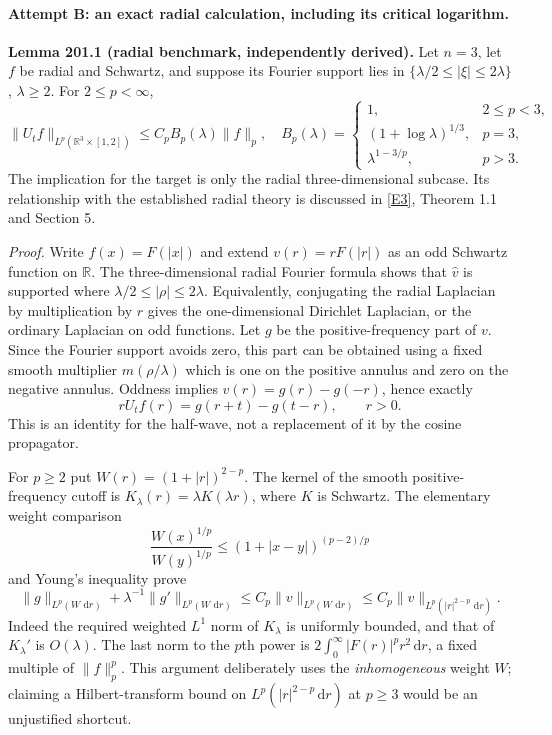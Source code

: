 \documentclass[11pt]{article}
\newcommand{\R}{\mathbb{R}}
\newcommand{\dd}{\,\mathrm d}
\newcommand{\eref}[2]{\hyperlink{extra:#1:#2}{[E#2]}}
\begin{document}
	\paragraph{Attempt B: an exact radial calculation, including its critical logarithm.}
	\textbf{Lemma 201.1 (radial benchmark, independently derived).}
	Let $n=3$, let $f$ be radial and Schwartz, and suppose its Fourier support
	lies in $\{\lambda/2\leq|\xi|\leq2\lambda\}$, $\lambda\geq2$.
	For $2\leq p<\infty$,
	\begin{equation}\label{statement:radialbound}
		\|U_tf\|_{L^p(\R^3\times[1,2])}
		\leq C_p B_p(\lambda)\|f\|_p,
		\quad
		B_p(\lambda)=
		\begin{cases}
			1,&2\leq p<3,\\
			(1+\log\lambda)^{1/3},&p=3,\\
			\lambda^{1-3/p},&p>3.
		\end{cases}
	\end{equation}
	The implication for the target is only the radial three-dimensional
	subcase. Its relationship with the established radial theory is discussed
	in \eref{statement}{3}, Theorem 1.1 and Section 5.
	
	\emph{Proof.}
	Write $f(x)=F(|x|)$ and extend $v(r)=rF(|r|)$ as an odd Schwartz
	function on $\R$. The three-dimensional radial Fourier formula shows
	that $\widehat v$ is supported where
	$\lambda/2\leq|\rho|\leq2\lambda$. Equivalently, conjugating the radial
	Laplacian by multiplication by $r$ gives the one-dimensional Dirichlet
	Laplacian, or the ordinary Laplacian on odd functions. Let $g$ be the
	positive-frequency part of $v$. Since the Fourier support avoids zero,
	this part can be obtained using a fixed smooth multiplier
	$m(\rho/\lambda)$ which is one on the positive annulus and zero on the
	negative annulus. Oddness implies $v(r)=g(r)-g(-r)$, hence exactly
	\begin{equation}\label{statement:radialidentity}
		rU_tf(r)=g(r+t)-g(t-r),\qquad r>0.
	\end{equation}
	This is an identity for the half-wave, not a replacement of it by the
	cosine propagator.
	
	For $p\geq2$ put $W(r)=(1+|r|)^{2-p}$. The kernel of the smooth
	positive-frequency cutoff is $K_\lambda(r)=\lambda K(\lambda r)$,
	where $K$ is Schwartz. The elementary weight comparison
	\[
	\frac{W(x)^{1/p}}{W(y)^{1/p}}
	\leq (1+|x-y|)^{(p-2)/p}
	\]
	and Young's inequality prove
	\begin{equation}\label{statement:weightedcutoff}
		\|g\|_{L^p(W\,\dd r)}+
		\lambda^{-1}\|g'\|_{L^p(W\,\dd r)}
		\leq C_p\|v\|_{L^p(W\,\dd r)}
		\leq C_p\|v\|_{L^p(|r|^{2-p}\,\dd r)}.
	\end{equation}
	Indeed the required weighted $L^1$ norm of $K_\lambda$ is uniformly
	bounded, and that of $K_\lambda'$ is $O(\lambda)$.
	The last norm to the $p$th power is
	$2\int_0^\infty |F(r)|^p r^2\dd r$, a fixed multiple of $\|f\|_p^p$.
	This argument deliberately uses the \emph{inhomogeneous} weight $W$;
	claiming a Hilbert-transform bound on $L^p(|r|^{2-p}\dd r)$ at $p\geq3$
	would be an unjustified shortcut.
	
\end{document}
